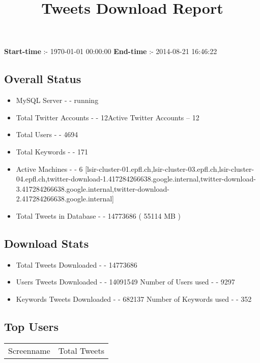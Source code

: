 \documentclass{article}\usepackage[T1]{fontenc}
\begin{document}
\title{\textbf{Tweets Download Report}}
               \date{}
                \maketitle
               \centerline{\textbf{Start-time} :- 1970-01-01 00:00:00 \hspace{40pt} \textbf{End-time} :- 2014-08-21 16:46:22}               \subsection*{Overall Status}                \begin{itemize}                \item MySQL Server - - running               \item Total Twitter Accounts - - 12\newline Active Twitter Accounts -- 12               \item Total Users - - 4694               \item Total Keywords - - 171               \item Active Machines - - 6 [lsir-cluster-01.epfl.ch,lsir-cluster-03.epfl.ch,lsir-cluster-04.epfl.ch,twitter-download-1.417284266638.google.internal,twitter-download-3.417284266638.google.internal,twitter-download-2.417284266638.google.internal]               \item Total Tweets in Database - - 14773686 ( 55114 MB )               \end{itemize}               \subsection*{Download Stats}                \begin{itemize}                \item Total Tweets Downloaded - - 14773686               \item Users Tweets Downloaded - - 14091549 \newline Number of Users used - - 9297               \item Keywords Tweets Downloaded - - 682137 \newline Number of Keywords used - - 352              \end{itemize}              \subsection*{Top Users}\begin{tabular}{|c|c|}         \hline         Screenname & Total Tweets \\ 

\end{tabular}
\end{document}
